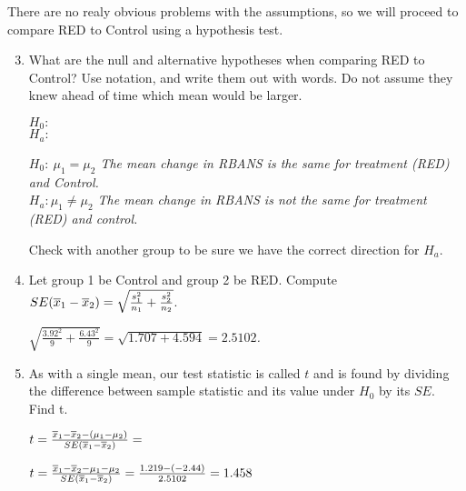There are no realy obvious problems with the assumptions, so we will
proceed to compare RED to Control  using a hypothesis test.

\begin{enumerate}
\setcounter{enumi}{2}

\item  What are the null and alternative hypotheses when comparing RED
  to Control? Use notation, and write them out with words.
  Do not assume they knew ahead of time which  mean would be
  larger. \\
\begin{students}
 $H_0:$    \vspace{1cm}    \\ $H_a:$    \vspace{1cm}
\end{students}
\begin{key}
  {\it   $H_0:\ \mu_1 = \mu_2$ The mean change in RBANS is the same
    for treatment (RED) and Control.    \\ $H_a: \mu_1 \neq \mu_2$ The
    mean change in RBANS is not the same for treatment (RED) and control.  }
\end{key}

   Check with another group to be sure we have the correct
   direction for $H_a$.

\item  Let group 1 be Control and group 2 be RED. Compute $SE(\overline{x}_1 -
  \overline{x}_2) = \sqrt{\frac{s_1^2}{n_1} +     \frac{s_2^2}{n_2}}$. 
\begin{students}
    \vspace{2cm}    
\end{students}

\begin{key}
  {\it  $ \sqrt{\frac{3.92^2}{9} +    \frac{6.43^2}{9}} = \sqrt{1.707
    +4.594} = 2.5102$.} 
\end{key}
\item As with a single mean, our test statistic is called $t$ and is
  found by dividing  the difference between sample statistic and its
  value under $H_0$ by its $SE.$  Find t. \\
\begin{students}
  $ t = \frac{\overline{x}_1 - \overline{x}_2 - (\mu_1 - \mu_2)}{SE(\overline{x}_1-\overline{x}_2)} = $
    \vspace{2cm}    
\end{students}

\begin{key}
   $ t = \frac{\overline{x}_1 - \overline{x}_2 - \mu_1 - \mu_2}{SE(\overline{x}_1-\overline{x}_2)} = 
          \frac{ 1.219-( -2.44)}{2.5102} = 1.458 $
\end{key}


\end{enumerate}
